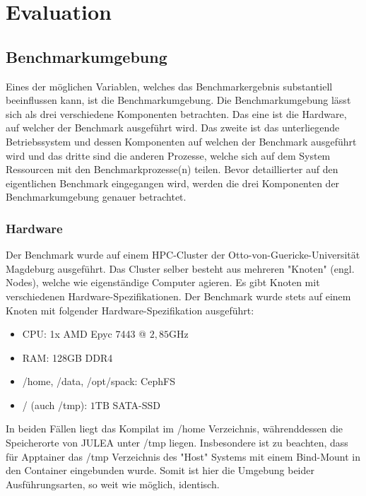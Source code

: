 \chapter{Evaluation} \label{cha:evaluation}

\section{Benchmarkumgebung}

Eines der möglichen Variablen, welches das Benchmarkergebnis substantiell beeinflussen kann, ist die Benchmarkumgebung. Die Benchmarkumgebung lässt sich als drei verschiedene Komponenten betrachten. Das eine ist die Hardware, auf welcher der Benchmark ausgeführt wird. Das zweite ist das unterliegende Betriebssystem und dessen Komponenten auf welchen der Benchmark ausgeführt wird und das dritte sind die anderen Prozesse, welche sich auf dem System Ressourcen mit den Benchmarkprozesse(n) teilen. Bevor detaillierter auf den eigentlichen Benchmark eingegangen wird, werden die drei Komponenten der Benchmarkumgebung genauer betrachtet.

\subsection{Hardware}

Der Benchmark wurde auf einem HPC-Cluster der Otto-von-Guericke-Universität Magdeburg ausgeführt. Das Cluster selber besteht aus mehreren "Knoten" (engl. Nodes), welche wie eigenständige Computer agieren. Es gibt Knoten mit verschiedenen Hardware-Spezifikationen. Der Benchmark wurde stets auf einem Knoten mit folgender Hardware-Spezifikation ausgeführt:

\begin{itemize}
    \item CPU: 1x AMD Epyc 7443 @ $2,85\text{GHz}$
    \item RAM: 128GB DDR4
    \item /home, /data, /opt/spack: CephFS
    \item /\*\* (auch /tmp): $1\text{TB}$ SATA-SSD  
\end{itemize}

In beiden Fällen liegt das Kompilat im /home Verzeichnis, währenddessen die Speicherorte von JULEA unter /tmp liegen. Insbesondere ist zu beachten, dass für Apptainer das /tmp Verzeichnis des "Host" Systems mit einem Bind-Mount in den Container eingebunden wurde. Somit ist hier die Umgebung beider Ausführungsarten, so weit wie möglich, identisch.

